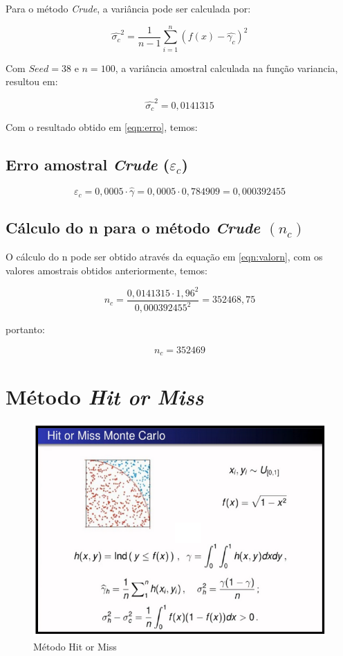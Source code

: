 \documentclass{article}
\begin{document}
Para o método \textit{Crude}, a variância pode ser calculada por:

\begin{equation*}
    \hat{\sigma_c}^2 = \frac{1}{n-1}\sum_{i=1}^n (f(x) - \hat{\gamma_c})^2
\end{equation*}

Com $Seed=38$ e $n=100$, a variância amostral calculada na função variancia, resultou em:

$$\hat{\sigma_c}^2 = 0,0141315$$

Com o resultado obtido em \ref{eqn:erro}, temos:

\subsection{Erro amostral \textit{Crude} ($\varepsilon_c$)}

\begin{equation*}
    \varepsilon_c = 0,0005\cdot\hat{\gamma} = 0,0005\cdot0,784909 = 0,000392455 
\end{equation*}

\subsection{Cálculo do n para o método \textit{Crude} $(n_c)$}

O cálculo do n pode ser obtido através da equação em \ref{eqn:valorn}, com os valores amostrais obtidos anteriormente, temos:

\begin{equation*}
    n_c = \frac{0,0141315\cdot1,96^2}{0,000392455^2} = 352468,75
\end{equation*}

portanto:

\[
    n_c = 352469
\]



\section{Método \textit{Hit or Miss}}

\begin{figure}[H]
    \centering
    \includegraphics[width=.7\linewidth]{Imagens/MC_HoM.png}
    \caption{Método Hit or Miss}
    \label{fig:HoM}
\end{figure}
\end{document}
